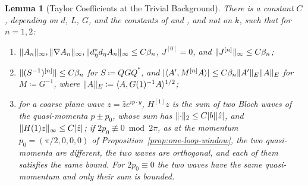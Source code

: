 \documentclass[11pt]{preprint}
\DeclarePairedDelimiter{\abs}{\lvert}{\rvert}
\DeclarePairedDelimiter{\norm}{\lVert}{\rVert}
\numberwithin{equation}{section}
\newtheorem{lemma}{Lemma}[section]
\theoremstyle{definition}
\theoremstyle{remark}
\theoremstyle{plain}
\begin{document}
\begin{lemma}[Taylor Coefficients at the Trivial Background]\label{lem:top-taylor}
There is a constant $C$, depending on $d$, $L$, $G$, and the constants of \cite{BalabanPBG} and \cite{BalabanVAR}, and not on $k$, such that for $n = 1, 2$:
\begin{enumerate}[label=(\roman*)]
\item $\norm{A_n}_\infty, \norm{\nabla A_n}_\infty, \norm{d_\eta^*d_\eta A_n}_\infty \leq C\beta_n$, $J^{[0]} = 0$, and $\norm{J^{[n]}}_\infty \leq C\beta_n$;
\item $\norm{(S^{-1})^{[n]}} \leq C\beta_n$ for $S \coloneqq QGQ^*$, and $\abs{\langle A', M^{[n]}A \rangle} \leq C\beta_n\norm{A'}_E\norm{A}_E$ for $M \coloneqq G^{-1}$, where $\norm{A}_E \coloneqq \langle A, G(1)^{-1}A \rangle^{1/2}$;
\item for a coarse plane wave $z = \hat ze^{ip\cdot y}$, $H^{[1]}z$ is the sum of two Bloch waves of the quasi-momenta $p \pm p_0$, whose sum has $\norm{\cdot}_2 \leq C\abs{b}\abs{\hat z}$, and $\norm{H(1)z}_\infty \leq C\abs{\hat z}$; if $2p_0 \not\equiv 0 \bmod 2\pi$, as at the momentum $p_0 = (\pi/2, 0, 0, 0)$ of Proposition~\ref{prop:one-loop-window}, the two quasi-momenta are different, the two waves are orthogonal, and each of them satisfies the same bound. For $2p_0 \equiv 0$ the two waves have the same quasi-momentum and only their sum is bounded.
\end{enumerate}
\end{lemma}
\end{document}
